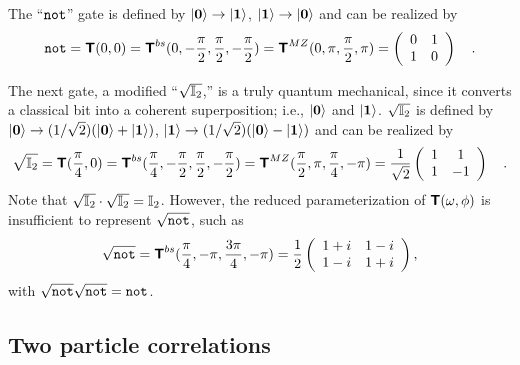 {The ``${\tt not}$'' gate is defined by
$\vert  {\bf 0}  \rangle  \rightarrow  \vert  {\bf 1}  \rangle $,
$\vert  {\bf 1}  \rangle  \rightarrow  \vert  {\bf 0}  \rangle $ and can be realized by
\begin{equation}
{\tt not} =
\textsf{\textbf{T}}(0,0)=
\textsf{\textbf{T}}^{bs}(0,-{\pi \over 2},{\pi \over 2},-{\pi \over 2})=
\textsf{\textbf{T}}^{MZ}(0,\pi ,{\pi \over 2} ,\pi )
=
\left(
\begin{array}{cc}
0&1
\\
1&0
 \end{array}
\right)
\quad .
\end{equation}


The next gate, a modified ``$\sqrt{{\Bbb I}_2}$,'' is a truly quantum
mechanical, since it converts a classical bit
into
a coherent superposition; i.e., $\vert  {\bf 0}  \rangle $ and $\vert  {\bf 1}  \rangle $.
$\sqrt{{\Bbb I}_2}$ is defined by
$\vert  {\bf 0}  \rangle  \rightarrow  (1/\sqrt{2})(\vert  {\bf 0}  \rangle  + \vert  {\bf 1}  \rangle )$,
$\vert  {\bf 1}  \rangle  \rightarrow  (1/\sqrt{2})(\vert  {\bf 0}  \rangle  - \vert  {\bf 1}  \rangle )$ and can
be realized by
\begin{equation}
\sqrt{{\Bbb I}_2} =
\textsf{\textbf{T}}({\pi \over 4},0)=
\textsf{\textbf{T}}^{bs}({\pi \over 4},-{\pi \over 2},{\pi \over 2},-{\pi \over 2})=
\textsf{\textbf{T}}^{MZ}({\pi \over 2},\pi ,{\pi \over 4} ,-\pi )
=
{1 \over \sqrt{2}}
\left(
\begin{array}{cc}
1&1
\\
1&-1
 \end{array}
\right)
\quad .
\end{equation}
Note that $\sqrt{{\Bbb I}_2}\cdot \sqrt{{\Bbb I}_2} = {\Bbb I}_2$.
However, the reduced parameterization of $\textsf{\textbf{T}}(\omega,\phi)$
is insufficient to represent $\sqrt{{\tt not}}$, such as
\begin{equation}
\sqrt{{\tt not}} =
\textsf{\textbf{T}}^{bs}({\pi \over 4},-\pi ,
{3\pi \over 4},
-\pi )=
{1 \over 2}
\left(
\begin{array}{cc}
1+i&1-i
\\
1-i&1+i
 \end{array}
\right)
,
\end{equation}
with
$
\sqrt{{\tt not}}
\sqrt{{\tt not}} = {\tt not}$.


\subsection{Two particle correlations}

}

